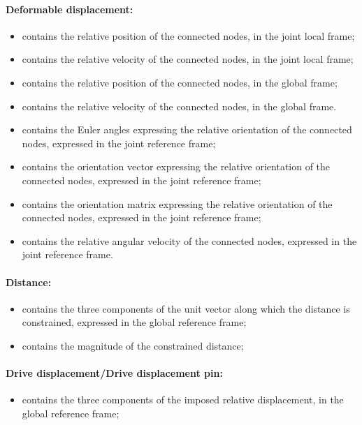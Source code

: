 \paragraph{Deformable displacement:}
\begin{itemize}
\item {} contains the relative position
  of the connected nodes, in the joint local frame;
\item {} contains the relative velocity
  of the connected nodes, in the joint local frame;
\item {} contains the relative position
  of the connected nodes, in the global frame;
\item {} contains the relative velocity
  of the connected nodes, in the global frame. 
\item {} contains the Euler angles 
  expressing the relative orientation of the connected nodes, expressed in 
  the joint reference frame;
\item {} contains the orientation vector
  expressing the relative orientation of the connected nodes, expressed in 
  the joint reference frame;
\item {} contains the orientation matrix
  expressing the relative orientation of the connected nodes, expressed in 
  the joint reference frame;
\item {} contains the relative angular
  velocity of the connected nodes, expressed in the joint reference frame.
\end{itemize}

\paragraph{Distance:}
\begin{itemize}
\item {} contains the three components
  of the unit vector along which the distance is constrained, 
  expressed in the global reference frame;
\item {} contains the magnitude of the
  constrained distance;
\end{itemize}

\paragraph{Drive displacement/Drive displacement pin:}
\begin{itemize}
\item {} contains the three components
  of the imposed relative displacement, in the global reference frame;
\end{itemize}

